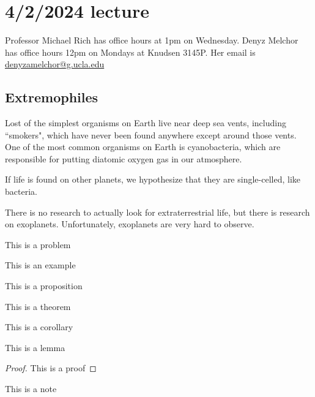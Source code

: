 \documentclass[class=article, crop=false]{standalone}
\begin{document}
\section{4/2/2024 lecture}

Professor Michael Rich has office hours at 1pm on Wednesday.
Denyz Melchor has office hours 12pm on Mondays at Knudsen 3145P. Her email is \url{denyzamelchor@g.ucla.edu}
\par
\subsection{Extremophiles}
Lost of the simplest organisms on Earth live near deep sea vents, including ``smokers", which have never been found anywhere except around those vents. One of the most common organisms on Earth is cyanobacteria, which are responsible for putting diatomic oxygen gas in our atmosphere.
\par
If life is found on other planets, we hypothesize that they are single-celled, like bacteria.
\par
There is no research to actually look for extraterrestrial life, but there is research on exoplanets. Unfortunately, exoplanets are very hard to observe.

\begin{prob}
    This is a problem
\end{prob}
\begin{example}
    This is an example
\end{example}
\begin{prop}
    This is a proposition
\end{prop}
\begin{thm}
    This is a theorem
\end{thm}
\begin{cor}
    This is a corollary
\end{cor}
\begin{lem}
    This is a lemma
\end{lem}
\begin{proof}
    This is a proof
\end{proof}
\begin{note}
    This is a note
\end{note}
\end{document}
